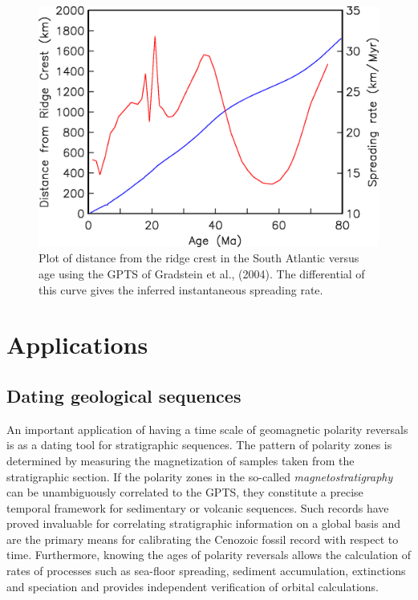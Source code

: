 \begin{figure}[htb]
\centering  \includegraphics[width=10 cm]{EPSfiles/spreadingrate.eps}
\caption{Plot of distance from the ridge crest in the South Atlantic versus age using the GPTS of Gradstein et al., (2004).  The differential of this curve gives the inferred instantaneous spreading rate.}
\label{fig:spreadingrate}
\end{figure}

\section{Applications}

\subsection{Dating geological sequences}

An important application of having a time scale of geomagnetic polarity reversals is  as a dating tool for
stratigraphic sequences. The pattern of polarity zones is determined by
measuring
the magnetization of samples taken from the stratigraphic section.  If the polarity zones in the
so-called 
{\it magnetostratigraphy} can be
unambiguously correlated to the GPTS, 
they constitute a precise temporal framework
for sedimentary or volcanic sequences. Such records have proved invaluable
for correlating stratigraphic information on a global basis and are the
primary means for calibrating the Cenozoic fossil 
record with respect to time.   Furthermore, knowing the ages of polarity reversals allows the calculation of rates of processes such as sea-floor spreading, sediment accumulation,  extinctions and speciation and provides independent verification of orbital calculations.  




